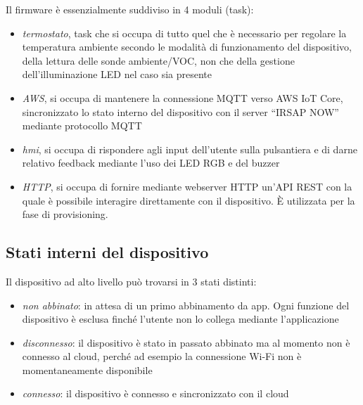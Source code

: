 \documentclass[12pt,a4paper,twoside,titlepage]{book}
\begin{document}
Il firmware è essenzialmente suddiviso in 4 moduli (task):

\begin{itemize}
    \item \textit{termostato}, task che si occupa di tutto quel che è necessario
        per regolare la temperatura ambiente secondo le modalità di funzionamento del dispositivo,
        della lettura delle sonde ambiente/VOC, non che della gestione dell'illuminazione LED
        nel caso sia presente
    \item \textit{AWS}, si occupa di mantenere la connessione MQTT verso AWS IoT Core,
        sincronizzato lo stato interno del dispositivo con il server ``IRSAP NOW'' mediante protocollo MQTT
    \item \textit{hmi}, si occupa di rispondere agli input dell'utente
        sulla pulsantiera e di darne relativo feedback mediante l'uso dei LED RGB e del buzzer
    \item \textit{HTTP}, si occupa di fornire mediante webserver HTTP un'API REST con
        la quale è possibile interagire direttamente con il dispositivo. È utilizzata
        per la fase di provisioning.
\end{itemize}

\subsection{Stati interni del dispositivo}

Il dispositivo ad alto livello può trovarsi in 3 stati distinti:

\begin{itemize}
    \item \textit{non abbinato}: in attesa di un primo abbinamento da app. Ogni funzione del
        dispositivo è esclusa finché l'utente non lo collega mediante l'applicazione
    \item \textit{disconnesso}: il dispositivo è stato in passato abbinato ma al momento non è
        connesso al cloud, perché ad esempio la connessione Wi-Fi non è momentaneamente disponibile
    \item \textit{connesso}: il dispositivo è connesso e sincronizzato con il cloud
\end{itemize}
\end{document}
